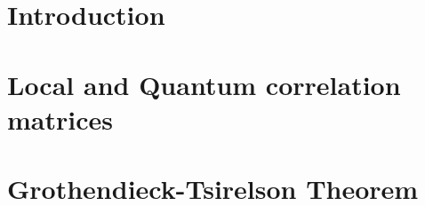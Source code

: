 \let \oldsection \section
\renewcommand{\section}{\vspace{15pt plus 8pt}\oldsection}
\let \oldsubsection \subsection
\renewcommand{\subsection}{\vspace{10pt plus 3pt}\oldsubsection}



\newpage
\section{Introduction} 
	\vspace{8pt}
	


\section{Local and Quantum correlation matrices} 
	\vspace{8pt}

	
\section{Grothendieck-Tsirelson Theorem} 
	
 
 
\appendix

		


